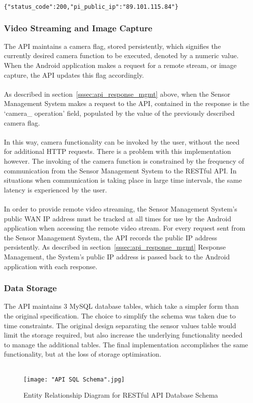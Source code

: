 \documentclass{article}
\begin{document}
\begin{lstlisting}[caption={JSON API Response to Android Application},label={lst:json_api_response_android}]
{"status_code":200,"pi_public_ip":"89.101.115.84"}
\end{lstlisting}

\subsubsection{Video Streaming and Image Capture}
\label{sssec:api_video_and_image}
The API maintains a camera flag, stored persistently, which signifies the currently desired camera function to be executed, denoted by a numeric value. When the Android application makes a request for a remote stream, or image capture, the API updates this flag accordingly. \\\\
As described in section~\ref{sssec:api_response_mgmt} above, when the Sensor Management System makes a request to the API, contained in the response is the ‘camera\_ operation’ field, populated by the value of the previously described camera flag. \\\\
In this way, camera functionality can be invoked by the user, without the need for additional HTTP requests. There is a problem with this implementation however. The invoking of the camera function is constrained by the frequency of communication from the Sensor Management System to the RESTful API. In situations when communication is taking place in large time intervals, the same latency is experienced by the user. \\\\
In order to provide remote video streaming, the Sensor Management System\rq s public WAN IP address must be tracked at all times for use by the Android application when accessing the remote video stream. For every request sent from the Sensor Management System, the API records the public IP address persistently. As described in section~\ref{sssec:api_response_mgmt} Response Management, the System\rq s public IP address is passed back to the Android application with each response. 

\newpage

\subsubsection{Data Storage}
The API maintains 3 MySQL database tables, which take a simpler form than the original specification. The choice to simplify the schema was taken due to time constraints. The original design separating the sensor values table would limit the storage required, but also increase the underlying functionality needed to manage the additional tables. The final implementation accomplishes the same functionality, but at the loss of storage optimisation. \\\\
\begin{figure}[H]
\centering
\texttt{[image: "API SQL Schema".jpg]}
\caption{Entity Relationship Diagram for RESTful API Database Schema}
\label{fig:api_schema}
\end{figure}
\end{document}
